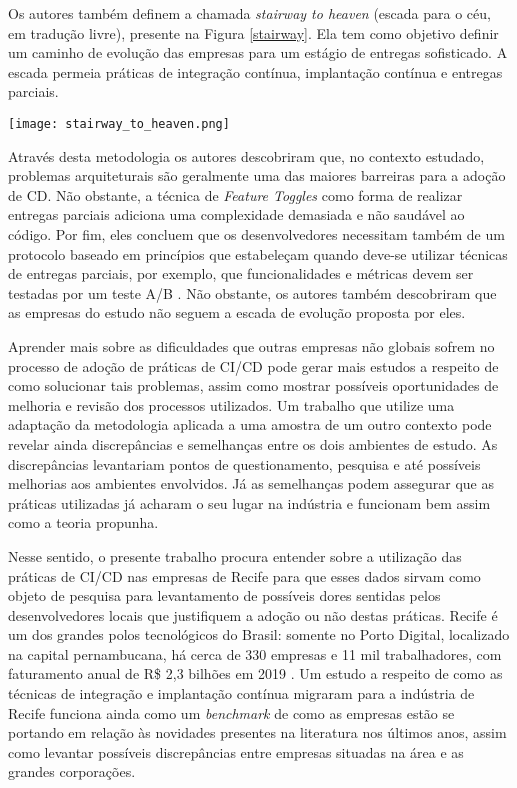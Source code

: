 Os autores também definem a chamada \emph{stairway to heaven} (escada para o céu, em tradução livre), presente na Figura \ref{stairway}. Ela tem como objetivo definir um caminho de evolução das empresas para um estágio de entregas sofisticado. A escada permeia práticas de integração contínua, implantação contínua e entregas parciais.

\begin{figure*}
\texttt{[image: stairway\_to\_heaven.png]}
\caption[Stairway to Heaven]{
    A escada de evolução denominada \emph{Stairway to Heaven} \cite{empiricalStudy2016}
}\label{stairway}

\end{figure*}

Através desta metodologia os autores descobriram que, no contexto estudado, problemas arquiteturais são geralmente uma das maiores barreiras para a adoção de CD. Não obstante, a técnica de \emph{Feature Toggles} \cite{featureToggles} como forma de realizar entregas parciais adiciona uma complexidade demasiada e não saudável ao código. Por fim, eles concluem que os desenvolvedores necessitam também de um protocolo baseado em princípios que estabeleçam quando deve-se utilizar técnicas de entregas parciais, por exemplo, que funcionalidades e métricas devem ser testadas por um teste A/B \cite{testsAB}. Não obstante, os autores também descobriram que as empresas do estudo não seguem a escada de evolução proposta por eles.

Aprender mais sobre as dificuldades que outras empresas não globais sofrem no processo de adoção de práticas de CI/CD pode gerar mais estudos a respeito de como solucionar tais problemas, assim como mostrar possíveis oportunidades de melhoria e revisão dos processos utilizados. Um trabalho que utilize uma adaptação da metodologia aplicada a uma amostra de um outro contexto pode revelar ainda discrepâncias e semelhanças entre os dois ambientes de estudo. As discrepâncias levantariam pontos de questionamento, pesquisa e até possíveis melhorias aos ambientes envolvidos. Já as semelhanças podem assegurar que as práticas utilizadas já acharam o seu lugar na indústria e funcionam bem assim como a teoria propunha.

Nesse sentido, o presente trabalho procura entender sobre a utilização das práticas de CI/CD nas empresas de Recife para que esses dados sirvam como objeto de pesquisa para levantamento de possíveis dores sentidas pelos desenvolvedores locais que justifiquem a adoção ou não destas práticas. Recife é um dos grandes polos tecnológicos do Brasil: somente no Porto Digital, localizado na capital pernambucana, há cerca de 330 empresas e 11 mil trabalhadores, com faturamento anual de R\$ 2,3 bilhões em 2019 \cite{portoDigital}. Um estudo a respeito de como as técnicas de integração e implantação contínua migraram para a indústria de Recife funciona ainda como um \emph{benchmark} de como as empresas estão se portando em relação às novidades presentes na literatura nos últimos anos, assim como levantar possíveis discrepâncias entre empresas situadas na área e as grandes corporações. 

